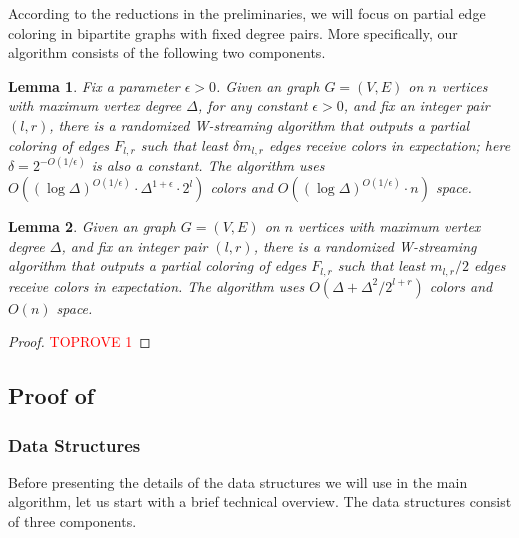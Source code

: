 \documentclass[11pt,a4paper]{article}
\newtheorem{lemma}{Lemma}[section]
\newcommand{\brac}[1]{\left(#1\right)}
\begin{document}
According to the reductions in the preliminaries, we will focus on partial edge coloring in bipartite graphs with fixed degree pairs. More specifically, our algorithm consists of the following two components.

\begin{lemma}\label{low}
	Fix a parameter $\epsilon > 0$. Given an graph $G = (V, E)$ on $n$ vertices with maximum vertex degree $\Delta$, for any constant $\epsilon > 0$, and fix an integer pair $(l, r)$, there is a randomized W-streaming algorithm that outputs a partial coloring of edges $F_{l, r}$ such that least $\delta m_{l, r}$ edges receive colors in expectation; here $\delta = 2^{-O(1/\epsilon)}$ is also a constant. The algorithm uses $O\brac{(\log\Delta)^{O(1 / \epsilon)}\cdot \Delta^{1+\epsilon}\cdot 2^l}$ colors and $O\brac{(\log\Delta)^{O(1 / \epsilon)}\cdot n}$ space.
\end{lemma}

\begin{lemma}\label{high}
	Given an graph $G = (V, E)$ on $n$ vertices with maximum vertex degree $\Delta$, and fix an integer pair $(l, r)$, there is a randomized W-streaming algorithm that outputs a partial coloring of edges $F_{l, r}$ such that least $m_{l, r}/2$ edges receive colors in expectation. The algorithm uses $O\brac{\Delta + \Delta^2 / 2^{l+r}}$ colors and $O(n)$ space.
	
\end{lemma}

\begin{proof}\textcolor{red}{TOPROVE 1}\end{proof}

\subsection{Proof of }
\subsubsection{Data Structures}\label{Btree}

Before presenting the details of the data structures we will use in the main algorithm, let us start with a brief technical overview. The data structures consist of three components.
\end{document}
